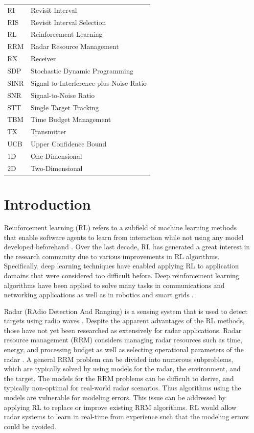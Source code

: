 \documentclass[english, 12pt, a4paper, elec, utf8, a-1b, online]{aaltothesis}
\begin{document}
\begin{tabular}{ll}
RI  & Revisit Interval \\
RIS & Revisit Interval Selection \\
RL & Reinforcement Learning \\
RRM & Radar Resource Management \\
RX & Receiver \\
SDP  & Stochastic Dynamic Programming \\
SINR  & Signal-to-Interference-plus-Noise Ratio \\
SNR & Signal-to-Noise Ratio \\
STT & Single Target Tracking \\
TBM & Time Budget Management \\
TX & Transmitter \\
UCB & Upper Confidence Bound \\
1D & One-Dimensional \\
2D & Two-Dimensional \\
\end{tabular}


\cleardoublepage
{}
\section{Introduction}
\setcounter{page}{1}

Reinforcement learning (RL) refers to a subfield of machine learning methods that enable software agents to learn from interaction while not using any model developed beforehand \cite{Sutton2018}. 
Over the last decade, RL has generated a great interest in the research community due to various improvements in RL algorithms. 
Specifically, deep learning techniques have enabled applying RL to application domains that were considered too difficult before. 
Deep reinforcement learning algorithms have been applied to solve many tasks in communications and networking applications \cite{Luong2018} as well as in robotics \cite{Kober2013} and smart grids \cite{Zhang2018}. 

Radar (RAdio Detection And Ranging) is a sensing system that is used to detect targets using radio waves \cite{Curry2011}.
Despite the apparent advantages of the RL methods, those have not yet been researched as extensively for radar applications.
Radar resource management (RRM) considers managing radar resources such as time, energy, and processing budget as well as selecting operational parameters of the radar \cite{Moo2016}. 
A general RRM problem can be divided into numerous subproblems, which are typically solved by using models for the radar, the environment, and the target.
The models for the RRM problems can be difficult to derive, and typically non-optimal for real-world radar scenarios. 
Thus algorithms using the models are vulnerable for modeling errors.
This issue can be addressed by applying RL to replace or improve existing RRM algorithms. 
RL would allow radar systems to learn in real-time from experience such that the modeling errors could be avoided. 
\end{document}
